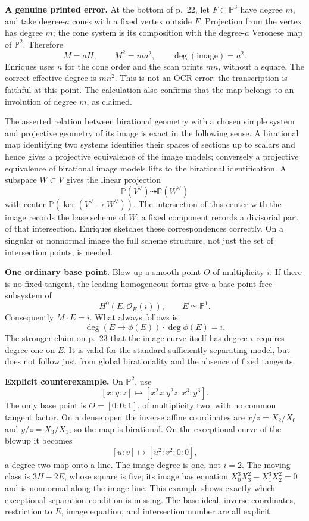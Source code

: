 \textbf{A genuine printed error.} At the bottom of p.~22, let \(F\subset\mathbb P^3\) have degree \(m\), and take degree-\(a\) cones with a fixed vertex outside \(F\). Projection from the vertex has degree \(m\); the cone system is its composition with the degree-\(a\) Veronese map of \(\mathbb P^2\). Therefore \[
M=aH,\qquad M^2=ma^2,\qquad
\deg(\text{image})=a^2.
\] Enriques uses \(n\) for the cone order and the scan prints \(mn\), without a square. The correct effective degree is \(mn^2\). This is not an OCR error: the transcription is faithful at this point. The calculation also confirms that the map belongs to an involution of degree \(m\), as claimed.

The asserted relation between birational geometry with a chosen simple system and projective geometry of its image is exact in the following sense. A birational map identifying two systems identifies their spaces of sections up to scalars and hence gives a projective equivalence of the image models; conversely a projective equivalence of birational image models lifts to the birational identification. A subspace \(W\subset V\) gives the linear projection \[
\mathbb P(V^\vee)\dashrightarrow\mathbb P(W^\vee)
\] with center \(\mathbb P(\ker(V^\vee\to W^\vee))\). The intersection of this center with the image records the base scheme of \(W\); a fixed component records a divisorial part of that intersection. Enriques sketches these correspondences correctly. On a singular or nonnormal image the full scheme structure, not just the set of intersection points, is needed.

\textbf{One ordinary base point.} Blow up a smooth point \(O\) of multiplicity \(i\). If there is no fixed tangent, the leading homogeneous forms give a base-point-free subsystem of \[
H^0(E,\mathcal O_E(i)),\qquad E\simeq\mathbb P^1.
\] Consequently \(M\cdot E=i\). What always follows is \[
\deg(E\longrightarrow\phi(E))\cdot\deg\phi(E)=i.
\] The stronger claim on p.~23 that the image curve itself has degree \(i\) requires degree one on \(E\). It is valid for the standard sufficiently separating model, but does not follow just from global birationality and the absence of fixed tangents.

\textbf{Explicit counterexample.} On \(\mathbb P^2\), use \[
[x:y:z]\longmapsto[x^2z:y^2z:x^3:y^3].
\] The only base point is \(O=[0:0:1]\), of multiplicity two, with no common tangent factor. On a dense open the inverse affine coordinates are \(x/z=X_2/X_0\) and \(y/z=X_3/X_1\), so the map is birational. On the exceptional curve of the blowup it becomes \[
[u:v]\longmapsto[u^2:v^2:0:0],
\] a degree-two map onto a line. The image degree is one, not \(i=2\). The moving class is \(3H-2E\), whose square is five; its image has equation \(X_0^3X_3^2-X_1^3X_2^2=0\) and is nonnormal along the image line. This example shows exactly which exceptional separation condition is missing. The base ideal, inverse coordinates, restriction to \(E\), image equation, and intersection number are all explicit.

